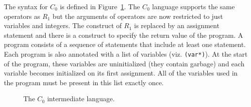 \documentclass[11pt]{book}
\begin{document}
The syntax for $C_0$ is defined in Figure~\ref{fig:c0-syntax}.  The
$C_0$ language supports the same operators as $R_1$ but the arguments
of operators are now restricted to just variables and integers. The
 construct of $R_1$ is replaced by an assignment statement
and there is a  construct to specify the return value of
the program. A program consists of a sequence of statements that
include at least one  statement. Each program is also
annotated with a list of variables (viz. {\tt (var*)}). At the start
of the program, these variables are uninitialized (they contain garbage)
and each variable becomes initialized on its first assignment. All of
the variables used in the program must be present in this list exactly once.

\begin{figure}[tp]
\caption{The $C_0$ intermediate language.}
\label{fig:c0-syntax}
\end{figure}
\end{document}
